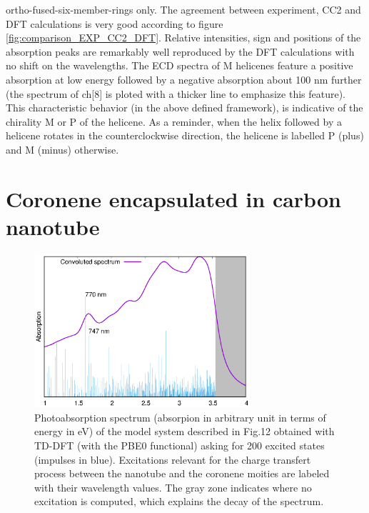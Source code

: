 \documentclass[aip]{revtex4-1}
\begin{document}
ortho-fused-six-member-rings only.
The agreement between experiment, CC2 and DFT calculations is very good according to
figure \ref{fig:comparison_EXP_CC2_DFT}.
Relative intensities, sign and positions of the absorption peaks are remarkably
well reproduced by the DFT calculations with no shift on the wavelengths.
The ECD spectra of M helicenes feature a positive absorption at low energy 
followed by a negative absorption about 100 nm further (the spectrum of ch[8]
is ploted with a thicker line to emphasize this feature).
This characteristic behavior (in the above defined framework), is indicative
of the chirality M or P of the helicene.
As a reminder, when the helix followed by a helicene rotates in the counterclockwise
direction, the helicene is labelled P (plus) and M (minus) otherwise.

\section*{Coronene encapsulated in carbon nanotube}
\begin{figure}
\begin{center}
\includegraphics[width=8cm]{spectrum_w_impulses.eps}
\end{center}
\caption{\label{fig:spectrum_nanotube} 
Photoabsorption spectrum
(absorpion in arbitrary unit in terms of energy in eV)
of the model system described in Fig.12
obtained with TD-DFT (with the PBE0 functional) asking for 200
excited states (impulses in blue).
Excitations relevant for the charge transfert process between
the nanotube and the coronene moities are labeled with their wavelength values.
The gray zone indicates where no excitation is computed, which explains the
decay of the spectrum.
}
\end{figure}
\end{document}

